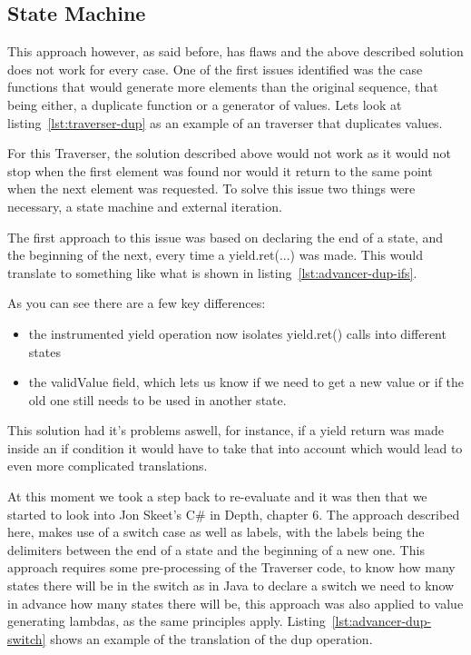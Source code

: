 \subsection{State Machine}

This approach however, as said before, has flaws and the above described solution does not work for every case. One of the first issues identified was the case functions that would generate more elements than the original sequence, that being either, a duplicate function or a generator of values. Lets look at listing~\ref{lst:traverser-dup} as an example of an traverser that duplicates values.



For this Traverser, the solution described above would not work as it would not stop when the first element was found nor would it return to the same point when the next element was requested. To solve this issue two things were necessary, a state machine and external iteration.

The first approach to this issue was based on declaring the end of a state, and the beginning of the next, every time a yield.ret(...) was made. This would translate to something like what is shown in listing~\ref{lst:advancer-dup-ifs}.



As you can see there are a few key differences:
\begin{itemize}
\item the instrumented yield operation now isolates yield.ret() calls into different states
\item the validValue field, which lets us know if we need to get a new value or if the old one still needs to be used in another state.
\end{itemize}

This solution had it's problems aswell, for instance, if a yield return was made inside an if condition it would have to take that into account which would lead to even more complicated translations.

At this moment we took a step back to re-evaluate and it was then that we started to look into Jon Skeet's C\# in Depth\citep{csharpindepth}, chapter 6. The approach described here, makes use of a switch case as well as labels, with the labels being the delimiters between the end of a state and the beginning of a new one. This approach requires some pre-processing of the Traverser code, to know how many states there will be in the switch as in Java to declare a switch we need to know in advance how many states there will be, this approach was also applied to value generating lambdas, as the same principles apply. Listing~\ref{lst:advancer-dup-switch} shows an example of the translation of the dup operation.

